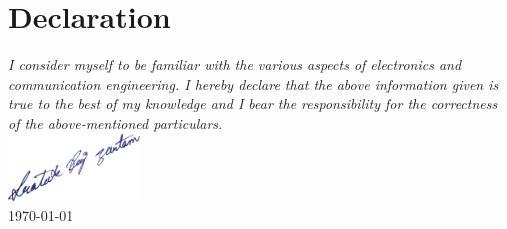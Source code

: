 \vspace{-2em}
\section{Declaration}
\vspace{-.5em}
{\sl I consider myself to be familiar with the various aspects of electronics and communication engineering. I hereby declare that the above information given is true to the best of my knowledge and I bear the responsibility for the correctness of the above-mentioned particulars.}\\
\includegraphics[width=3.5cm]{./includes/sign}\\
\vspace{-6pt}
\today
\vspace{1em}\\
\sectionline